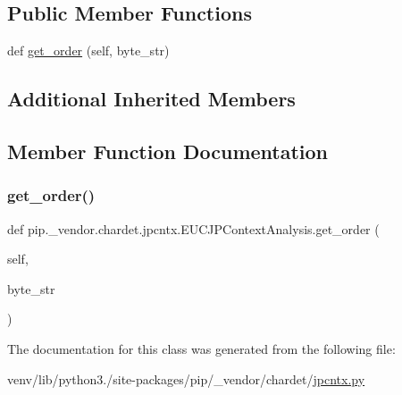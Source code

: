 \subsection*{Public Member Functions}
\begin{DoxyCompactItemize}
\item 
def \hyperlink{classpip_1_1__vendor_1_1chardet_1_1jpcntx_1_1EUCJPContextAnalysis_ad6537753a76664ada0796bd8fd0ae47e}{get\+\_\+order} (self, byte\+\_\+str)
\end{DoxyCompactItemize}
\subsection*{Additional Inherited Members}


\subsection{Member Function Documentation}
\mbox{\label{classpip_1_1__vendor_1_1chardet_1_1jpcntx_1_1EUCJPContextAnalysis_ad6537753a76664ada0796bd8fd0ae47e}} 
\subsubsection{\texorpdfstring{get\+\_\+order()}{get\_order()}}
{\footnotesize\ttfamily def pip.\+\_\+vendor.\+chardet.\+jpcntx.\+E\+U\+C\+J\+P\+Context\+Analysis.\+get\+\_\+order (\begin{DoxyParamCaption}\item[{}]{self,  }\item[{}]{byte\+\_\+str }\end{DoxyParamCaption})}



The documentation for this class was generated from the following file\+:\begin{DoxyCompactItemize}
\item 
venv/lib/python3./site-\/packages/pip/\+\_\+vendor/chardet/\hyperlink{jpcntx_8py}{jpcntx.\+py}\end{DoxyCompactItemize}
